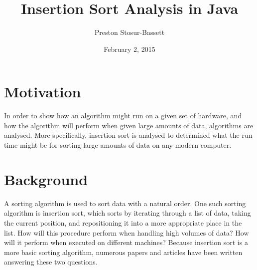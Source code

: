 \documentclass[onecolumn, 12pt, article]{IEEEtran}
\numberwithin{case}{problem}
\numberwithin{condition}{problem}
\numberwithin{condition}{subsection}
\numberwithin{definition}{section}
\theoremstyle{remark}
\numberwithin{question}{problem}
\theoremstyle{plain}
\numberwithin{answer}{problem}
\numberwithin{solution}{section}
\numberwithin{equation}{section}%
\begin{document}
\title{Insertion Sort Analysis in Java}
\author{Preston Stosur-Bassett}
\date{February 2, 2015}
\maketitle

\pagestyle{fancy}

\begin{abstract}
\end{abstract}

\section{Motivation}
In order to show how an algorithm might run on a given set of hardware, and how the algorithm will perform when given large amounts of data, algorithms are analysed. More specifically, insertion sort is analysed to determined what the run time might be for sorting large amounts of data on any modern computer.

\section{Background}
A sorting algorithm is used to sort data with a natural order. One such sorting algorithm is insertion sort, which sorts by iterating through a list of data, taking the current position, and repositioning it into a more appropriate place in the list. How will this procedure perform when handling high volumes of data? How will it perform when executed on different machines? Because insertion sort is a more basic sorting algorithm, numerous papers and articles have been written answering these two questions.

\end{document}
